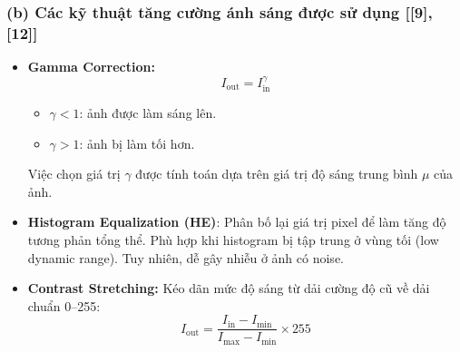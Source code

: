 \subsubsection*{(b) Các kỹ thuật tăng cường ánh sáng được sử dụng [[9], [12]]}
\begin{itemize}[]
    \item \textbf{Gamma Correction:}
    \[ I_{\text{out}} = I_{\text{in}}^{\gamma} \]
    \begin{itemize}[]
        \item $\gamma < 1$: ảnh được làm sáng lên.
        \item $\gamma > 1$: ảnh bị làm tối hơn.
    \end{itemize}
    Việc chọn giá trị $\gamma$ được tính toán dựa trên giá trị độ sáng trung bình $\mu$ của ảnh.

    \item \textbf{Histogram Equalization (HE)}:
    Phân bố lại giá trị pixel để làm tăng độ tương phản tổng thể. Phù hợp khi histogram bị tập trung ở vùng tối (low dynamic range). Tuy nhiên, dễ gây nhiễu ở ảnh có noise.

    \item \textbf{Contrast Stretching:}
    Kéo dãn mức độ sáng từ dải cường độ cũ về dải chuẩn 0--255:
    \[ I_{\text{out}} = \frac{I_{\text{in}} - I_{\min}}{I_{\max} - I_{\min}} \times 255 \]
    


\end{itemize}
